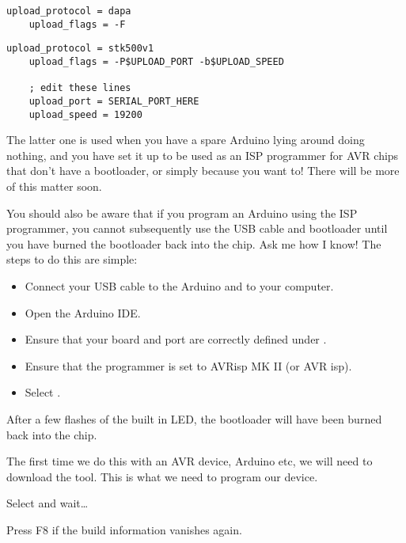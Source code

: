 \begin{lstlisting}[caption={The \inline{platformio.ini} additions for `Parallel Port' ISP Programmer}]
    upload_protocol = dapa
    upload_flags = -F
\end{lstlisting}


\begin{lstlisting}[caption={The \inline{platformio.ini} additions for `Arduino as ISP` Programmer}]
    upload_protocol = stk500v1
    upload_flags = -P$UPLOAD_PORT -b$UPLOAD_SPEED

    ; edit these lines
    upload_port = SERIAL_PORT_HERE
    upload_speed = 19200
\end{lstlisting}

The latter one is used when you have a spare Arduino lying around doing nothing, and you have set it up to be used as an ISP programmer for AVR chips that don't have a bootloader, or simply because you want to! There will be more of this matter soon.

\begin{warning}
You should also be aware that if you program an Arduino using the ISP programmer, you cannot subsequently use the USB cable and bootloader until you have burned the bootloader back into the chip. Ask me how I know! The steps to do this are simple:

\begin{itemize}
\item Connect your USB cable to the Arduino and to your computer.
\item Open the Arduino IDE.
\item Ensure that your board and port are correctly defined under .
\item Ensure that the programmer is set to AVRisp MK II (or AVR isp).
\item Select .
\end{itemize}

After a few flashes of the built in LED, the bootloader will have been burned back into the chip. 
\end{warning}

The first time we do this with an AVR device, Arduino etc, we will need to
download the  tool. This is what we need to program
our device.

Select  and wait\ldots{}

Press F8 if the build information vanishes again.

